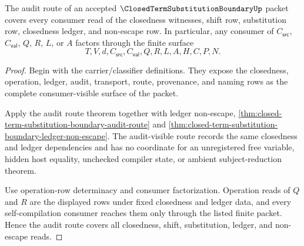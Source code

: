 \begin{theorem}
\label{thm:closed-term-substitution-boundary-audit-route-coverage}
The audit route of an accepted $\ClosedTermSubstitutionBoundaryUp$ packet covers every consumer read of the closedness witnesses, shift row, substitution row, closedness ledger, and non-escape row. In particular, any consumer of $C_{\mathsf{src}}$, $C_{\mathsf{val}}$, $Q$, $R$, $L$, or $A$ factors through the finite surface
$$
T,V,d,C_{\mathsf{src}},C_{\mathsf{val}},Q,R,L,A,H,C,P,N.
$$
\end{theorem}
\begin{proof}
Begin with the carrier/classifier definitions. They expose the closedness, operation, ledger, audit, transport, route, provenance, and naming rows as the complete consumer-visible surface of the packet.

Apply the audit route theorem together with ledger non-escape, \autoref{thm:closed-term-substitution-boundary-audit-route} and \autoref{thm:closed-term-substitution-boundary-ledger-non-escape}. The audit-visible route records the same closedness and ledger dependencies and has no coordinate for an unregistered free variable, hidden host equality, unchecked compiler state, or ambient subject-reduction theorem.

Use operation-row determinacy and consumer factorization. Operation reads of $Q$ and $R$ are the displayed rows under fixed closedness and ledger data, and every self-compilation consumer reaches them only through the listed finite packet. Hence the audit route covers all closedness, shift, substitution, ledger, and non-escape reads.
\end{proof}

